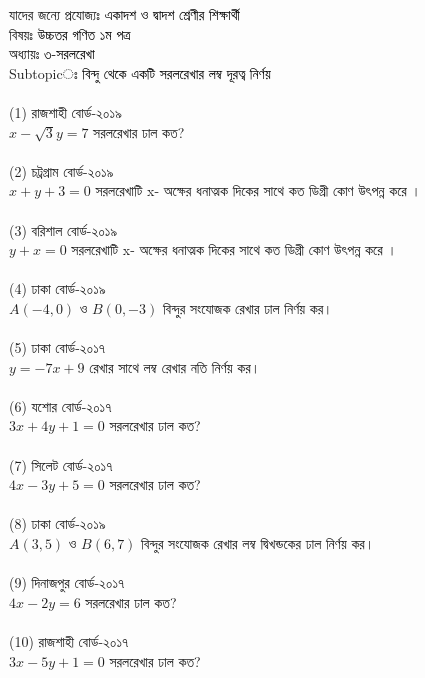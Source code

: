 \documentclass{article}
\begin{document}
 
	\Large
	যাদের জন্যে প্রযোজ্যঃ  	\textcolor{black}{একাদশ ও দ্বাদশ শ্রেণীর শিক্ষার্থী} \\
বিষয়ঃ \textcolor{black}{উচ্চতর গণিত ১ম পত্র} \\
অধ্যায়ঃ \textcolor{black}{৩-সরলরেখা }\\ 
Subtopicঃ \textcolor{black}{বিন্দু থেকে একটি  সরলরেখার লম্ব দূরত্ব নির্ণয়}\\	
\\
(1) রাজশাহী বোর্ড-২০১৯\\
$x-\sqrt{3}y=7$ সরলরেখার ঢাল কত?\\
\\
(2) চট্রগ্রাম বোর্ড-২০১৯\\
$x+y+3=0$ সরলরেখাটি x-  অক্ষের ধনাত্মক দিকের সাথে কত ডিগ্রী কোণ উৎপন্ন করে । \\
\\
(3) বরিশাল বোর্ড-২০১৯\\
$y+x=0$ সরলরেখাটি x-  অক্ষের ধনাত্মক দিকের সাথে কত ডিগ্রী কোণ উৎপন্ন করে । \\
\\
(4) ঢাকা বোর্ড-২০১৯\\
$A(-4,0)$ ও $B(0,-3)$ বিন্দুর সংযোজক রেখার ঢাল নির্ণয় কর।\\
\\
(5) ঢাকা বোর্ড-২০১৭\\
$y=-7x+9$ রেখার সাথে লম্ব রেখার নতি নির্ণয় কর।\\
\\
(6) যশোর বোর্ড-২০১৭\\
$3x+4y+1=0$ সরলরেখার ঢাল কত?\\  
\\
(7) সিলেট বোর্ড-২০১৭\\
$4x-3y+5=0$ সরলরেখার ঢাল কত?\\
\\
(8) ঢাকা বোর্ড-২০১৯\\
$A(3,5)$ ও $B(6,7)$ বিন্দুর সংযোজক রেখার লম্ব দ্বিখন্ডকের ঢাল নির্ণয় কর।\\  
\\
(9) দিনাজপুর  বোর্ড-২০১৭\\
$4x-2y=6$ সরলরেখার ঢাল কত?\\
\\
(10) রাজশাহী  বোর্ড-২০১৭\\
$3x-5y+1=0$ সরলরেখার ঢাল কত?\\
\end{document}
